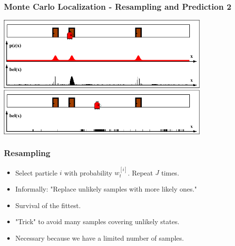 \begin{frame}
    \frametitle{Monte Carlo Localization - Resampling and Prediction 2}
    \begin{center}
        \includegraphics[width=0.8\textwidth]{./images/particle_filter/monte_carlo_resample_and_predict2.pdf}
    \end{center}
\end{frame}

\begin{frame}
    \frametitle{Resampling}
    \begin{itemize}
        \item Select particle $i$ with probability $w_t^{[i]}$. Repeat $J$ times.
        \item Informally: "Replace unlikely samples with more likely ones."
        \item Survival of the fittest.
        \item "Trick" to avoid many samples covering unlikely states.
        \item Necessary because we have a limited number of samples.
    \end{itemize}
\end{frame}

